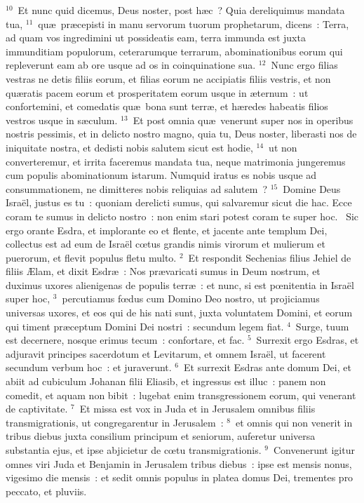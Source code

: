 ${}^{10}$~Et nunc quid dicemus, Deus noster, post h\ae c~? Quia dereliquimus mandata tua,
${}^{11}$~qu\ae\ pr\ae cepisti in manu servorum tuorum prophetarum, dicens~: Terra, ad quam vos ingredimini ut possideatis eam, terra immunda est juxta immunditiam populorum, ceterarumque terrarum, abominationibus eorum qui repleverunt eam ab ore usque ad os in coinquinatione sua.
${}^{12}$~Nunc ergo filias vestras ne detis filiis eorum, et filias eorum ne accipiatis filiis vestris, et non qu\ae ratis pacem eorum et prosperitatem eorum usque in \ae ternum~: ut confortemini, et comedatis qu\ae\ bona sunt terr\ae , et h\ae redes habeatis filios vestros usque in s\ae culum.
${}^{13}$~Et post omnia qu\ae\ venerunt super nos in operibus nostris pessimis, et in delicto nostro magno, quia tu, Deus noster, liberasti nos de iniquitate nostra, et dedisti nobis salutem sicut est hodie,
${}^{14}$~ut non converteremur, et irrita faceremus mandata tua, neque matrimonia jungeremus cum populis abominationum istarum. Numquid iratus es nobis usque ad consummationem, ne dimitteres nobis reliquias ad salutem~?
${}^{15}$~Domine Deus Isra\"el, justus es tu~: quoniam derelicti sumus, qui salvaremur sicut die hac. Ecce coram te sumus in delicto nostro~: non enim stari potest coram te super hoc.
~Sic ergo orante Esdra, et implorante eo et flente, et jacente ante templum Dei, collectus est ad eum de Isra\"el cœtus grandis nimis virorum et mulierum et puerorum, et flevit populus fletu multo.
${}^{2}$~Et respondit Sechenias filius Jehiel de filiis \AE lam, et dixit Esdr\ae~: Nos pr\ae varicati sumus in Deum nostrum, et duximus uxores alienigenas de populis terr\ae~: et nunc, si est pœnitentia in Isra\"el super hoc,
${}^{3}$~percutiamus fœdus cum Domino Deo nostro, ut projiciamus universas uxores, et eos qui de his nati sunt, juxta voluntatem Domini, et eorum qui timent pr\ae ceptum Domini Dei nostri~: secundum legem fiat.
${}^{4}$~Surge, tuum est decernere, nosque erimus tecum~: confortare, et fac.
${}^{5}$~Surrexit ergo Esdras, et adjuravit principes sacerdotum et Levitarum, et omnem Isra\"el, ut facerent secundum verbum hoc~: et juraverunt.
${}^{6}$~Et surrexit Esdras ante domum Dei, et abiit ad cubiculum Johanan filii Eliasib, et ingressus est illuc~: panem non comedit, et aquam non bibit~: lugebat enim transgressionem eorum, qui venerant de captivitate.
${}^{7}$~Et missa est vox in Juda et in Jerusalem omnibus filiis transmigrationis, ut congregarentur in Jerusalem~:
${}^{8}$~et omnis qui non venerit in tribus diebus juxta consilium principum et seniorum, auferetur universa substantia ejus, et ipse abjicietur de cœtu transmigrationis.
${}^{9}$~Convenerunt igitur omnes viri Juda et Benjamin in Jerusalem tribus diebus~: ipse est mensis nonus, vigesimo die mensis~: et sedit omnis populus in platea domus Dei, trementes pro peccato, et pluviis.


